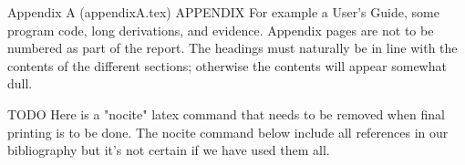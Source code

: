 Appendix A (appendixA.tex)
APPENDIX For example a User's Guide, some program code, long derivations, and
evidence. Appendix pages are not to be numbered as part of the report. The headings must
naturally be in line with the contents of the different sections; otherwise the contents will
appear somewhat dull.

TODO Here is a "nocite" latex command that needs to be removed when final printing is to be done. The nocite command below include all references in our bibliography but it's not certain if we have used them all.
\nocite{*}
